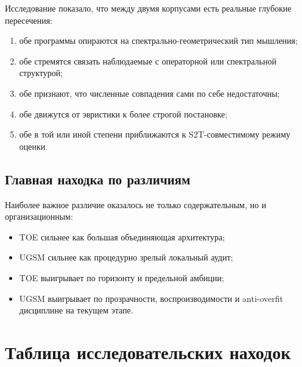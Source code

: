 \documentclass[12pt,a4paper]{article}
\begin{document}
Исследование показало, что между двумя корпусами есть реальные глубокие пересечения:
\begin{enumerate}
    \item обе программы опираются на спектрально-геометрический тип мышления;
    \item обе стремятся связать наблюдаемые с операторной или спектральной структурой;
    \item обе признают, что численные совпадения сами по себе недостаточны;
    \item обе движутся от эвристики к более строгой постановке;
    \item обе в той или иной степени приближаются к S2T-совместимому режиму оценки.
\end{enumerate}

\subsection{Главная находка по различиям}

Наиболее важное различие оказалось не только содержательным, но и организационным:
\begin{itemize}
    \item TOE сильнее как большая объединяющая архитектура;
    \item UGSM сильнее как процедурно зрелый локальный аудит;
    \item TOE выигрывает по горизонту и предельной амбиции;
    \item UGSM выигрывает по прозрачности, воспроизводимости и anti-overfit дисциплине на текущем этапе.
\end{itemize}

\section{Таблица исследовательских находок}
\end{document}

